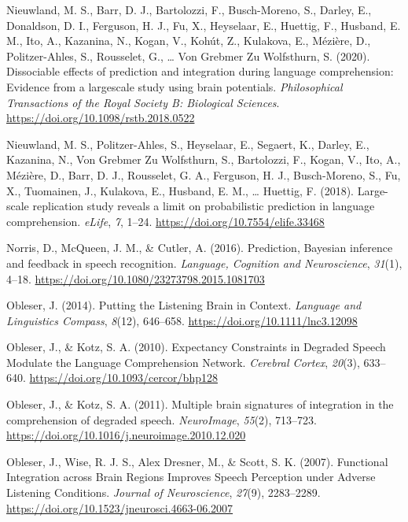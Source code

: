 \documentclass[a4paper, nobind]{templates/ociamthesis}
\newlength{\cslhangindent}
\newenvironment{CSLReferences}[2] %
 {%
  \setlength{\parindent}{0pt}
  \ifodd #1
  \let\oldpar\par
  \def\par{\hangindent=\cslhangindent\oldpar}
  \fi
  \setlength{\parskip}{1mm}
  \setlength{\baselineskip}{6mm}
 }%
 {}
\begin{document}
\begin{CSLReferences}{1}{0}
\leavevmode{}%
Nieuwland, M. S., Barr, D. J., Bartolozzi, F., Busch-Moreno, S., Darley, E., Donaldson, D. I., Ferguson, H. J., Fu, X., Heyselaar, E., Huettig, F., Husband, E. M., Ito, A., Kazanina, N., Kogan, V., Kohút, Z., Kulakova, E., Mézière, D., Politzer-Ahles, S., Rousselet, G., \ldots{} Von Grebmer Zu Wolfsthurn, S. (2020). {Dissociable effects of prediction and integration during language comprehension: Evidence from a largescale study using brain potentials}. \emph{Philosophical Transactions of the Royal Society B: Biological Sciences}. \url{https://doi.org/10.1098/rstb.2018.0522}

\leavevmode{}%
Nieuwland, M. S., Politzer-Ahles, S., Heyselaar, E., Segaert, K., Darley, E., Kazanina, N., Von Grebmer Zu Wolfsthurn, S., Bartolozzi, F., Kogan, V., Ito, A., Mézière, D., Barr, D. J., Rousselet, G. A., Ferguson, H. J., Busch-Moreno, S., Fu, X., Tuomainen, J., Kulakova, E., Husband, E. M., \ldots{} Huettig, F. (2018). {Large-scale replication study reveals a limit on probabilistic prediction in language comprehension}. \emph{eLife}, \emph{7}, 1--24. \url{https://doi.org/10.7554/elife.33468}

\leavevmode{}%
Norris, D., McQueen, J. M., \& Cutler, A. (2016). {Prediction, Bayesian inference and feedback in speech recognition}. \emph{Language, Cognition and Neuroscience}, \emph{31}(1), 4--18. \url{https://doi.org/10.1080/23273798.2015.1081703}

\leavevmode{}%
Obleser, J. (2014). Putting the Listening Brain in Context. \emph{Language and Linguistics Compass}, \emph{8}(12), 646--658. \url{https://doi.org/10.1111/lnc3.12098}

\leavevmode{}%
Obleser, J., \& Kotz, S. A. (2010). Expectancy Constraints in Degraded Speech Modulate the Language Comprehension Network. \emph{Cerebral Cortex}, \emph{20}(3), 633--640. \url{https://doi.org/10.1093/cercor/bhp128}

\leavevmode{}%
Obleser, J., \& Kotz, S. A. (2011). Multiple brain signatures of integration in the comprehension of degraded speech. \emph{NeuroImage}, \emph{55}(2), 713--723. \url{https://doi.org/10.1016/j.neuroimage.2010.12.020}

\leavevmode{}%
Obleser, J., Wise, R. J. S., Alex Dresner, M., \& Scott, S. K. (2007). Functional Integration across Brain Regions Improves Speech Perception under Adverse Listening Conditions. \emph{Journal of Neuroscience}, \emph{27}(9), 2283--2289. \url{https://doi.org/10.1523/jneurosci.4663-06.2007}


\end{CSLReferences}
\end{document}
